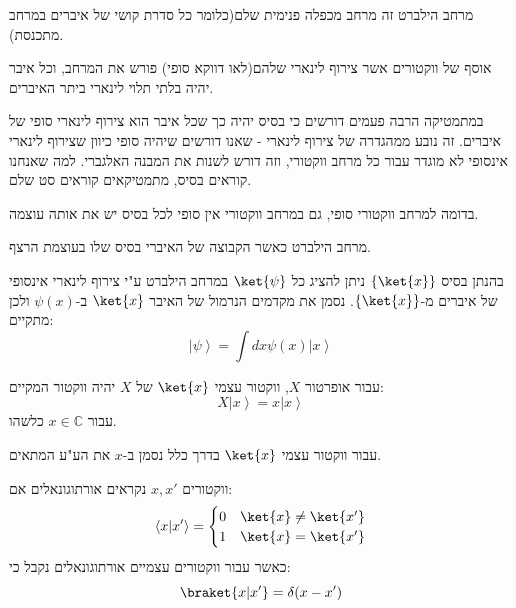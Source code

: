 \documentclass{tstextbook}
\begin{document}
\begin{definition}
מרחב הילברט זה מרחב מכפלה פנימית שלם(כלומר כל סדרת קושי של איברים במרחב מתכנסת).

\end{definition}
\begin{definition}
אוסף של ווקטורים אשר צירוף לינארי שלהם(לאו דווקא סופי) פורש את המרחב, וכל איבר יהיה בלתי תלוי לינארי ביתר האיברים.

\end{definition}
\begin{remark}
במתמטיקה הרבה פעמים דורשים כי בסיס יהיה כך שכל איבר הוא צירוף לינארי סופי של איברים. זה נובע ממהגדרה של צירוף לינארי - שאנו דורשים שיהיה סופי כיוון שצירוף לינארי אינסופי לא מוגדר עבור כל מרחב ווקטורי, וזה דורש לשנות את המבנה האלגברי. למה שאנחנו קוראים בסיס, מתמטיקאים קוראים סט שלם.

\end{remark}
\begin{proposition}
בדומה למרחב ווקטורי סופי, גם במרחב ווקטורי אין סופי לכל בסיס יש את אותה עוצמה.

\end{proposition}
\begin{definition}
מרחב הילברט כאשר הקבוצה של האיברי בסיס שלו בעוצמת הרצף.

\end{definition}
\begin{definition}
בהנתן בסיס \(\left\{  \ket{x}  \right\}\) ניתן להציג כל \(\ket{\psi}\) במרחב הילברט ע"י צירוף לינארי אינסופי של איברים מ-\(\left\{  \ket{x}  \right\}\). נסמן את מקדמים הנרמול של האיבר \(\ket{x}\) ב-\(\psi(x)\) ולכן מתקיים:
$$\left|\psi\right\rangle=\int d x\psi\left(x\right)\left|x\right\rangle$$

\end{definition}
\begin{definition}
עבור אופרטור \(X\), ווקטור עצמי \(\ket{x}\) של \(X\) יהיה ווקטור המקיים:
$$X\left|x\right\rangle=x\left|x\right\rangle$$
עבור \(x \in \mathbb{C}\) כלשהו.

\end{definition}
\begin{symbolize}
עבור ווקטור עצמי \(\ket{x}\) בדרך כלל נסמן ב-\(x\) את הע"ע המתאים.

\end{symbolize}
\begin{definition}[אורתוגונאליות]
ווקטורים \(x,x'\) נקראים אורתוגונאלים אם:
$$\left\langle  x|x^{\prime} \right\rangle=\begin{cases}0 & \ket{x} \neq \ket{x'} \\1 & \ket{x} =\ket{x'}  
\end{cases}$$
כאשר עבור ווקטורים עצמיים אורתוגונאלים נקבל כי:
$$\braket{ x | x' } =\delta(x-x')  $$

\end{definition}
\end{document}
